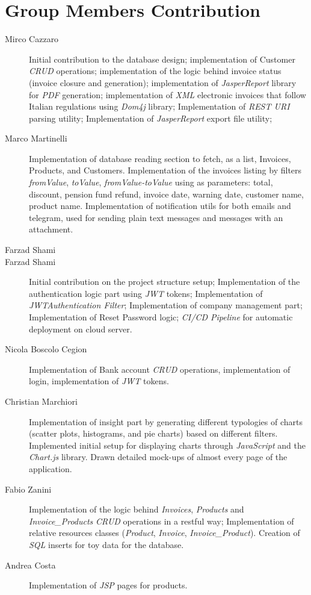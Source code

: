 \newpage
\section{Group Members Contribution}


\begin{description}
	\item[Mirco Cazzaro] Initial contribution to the database design; implementation of Customer \textit{CRUD} operations; implementation of the logic behind invoice status (invoice closure and generation); implementation of \textit{JasperReport} library for \textit{PDF} generation; implementation of \textit{XML} electronic invoices that follow Italian regulations using \textit{Dom4j} library; Implementation of \textit{REST URI} parsing utility; Implementation of \textit{JasperReport} export file utility;
	\item[Marco Martinelli] Implementation of database reading section to fetch, as a list, Invoices, Products, and Customers. 
    Implementation of the invoices listing by filters \textit{fromValue}, \textit{toValue}, \textit{fromValue-toValue} using as parameters: total, discount, pension fund refund, invoice date, warning date, customer name, product name.
    Implementation of notification utils for both emails and telegram, used for sending plain text messages and messages with an attachment.  
	\item[Farzad Shami] \item[Farzad Shami] Initial contribution on the project structure setup; Implementation of the authentication logic part using \textit{JWT} tokens; Implementation of \textit{JWTAuthentication Filter}; Implementation of company management part; Implementation of Reset Password logic; \textit{CI/CD Pipeline} for automatic deployment on cloud server.
	\item[Nicola Boscolo Cegion] Implementation of Bank account \textit{CRUD} operations, implementation of login, implementation of \textit{JWT} tokens.
	\item[Christian Marchiori] Implementation of insight part by generating different typologies of charts (scatter plots, histograms, and pie charts) based on different filters. Implemented initial setup for displaying charts through \textit{JavaScript} and the \textit{Chart.js} library. Drawn detailed mock-ups of almost every page of the application.
	\item[Fabio Zanini] Implementation of the logic behind \textit{Invoices}, \textit{Products} and \textit{Invoice\_Products} \textit{CRUD} operations in a restful way; Implementation of relative resources classes (\textit{Product}, \textit{Invoice}, \textit{Invoice\_Product}). Creation of \textit{SQL} inserts for toy data for the database.
	\item[Andrea Costa] Implementation of \textit{JSP} pages for products.
\end{description}
